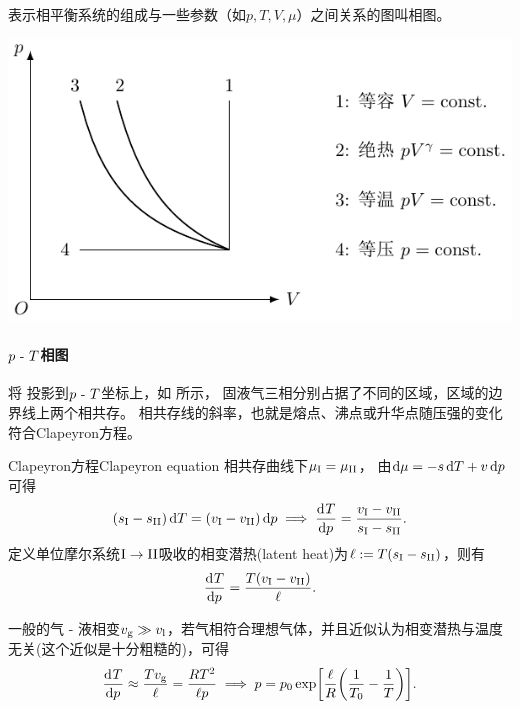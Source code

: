 表示相平衡系统的组成与一些参数（如$p,T,V,\mu$）之间关系的图叫相图。
\begin{center}
	\includegraphics[page=8]{figures/tikz/coordinates.pdf}
	\label{fig:H2O phase P-T-V}
\end{center}

\paragraph{$p~\text{-}~ T$相图}

将 投影到$p~\text{-}~ T$坐标上，如 所示，
固液气三相分别占据了不同的区域，区域的边界线上两个相共存。
相共存线的斜率，也就是熔点、沸点或升华点随压强的变化符合Clapeyron方程。

\begin{theorem}
	{Clapeyron方程}{Clapeyron equation}
	相共存曲线下$\mu_{\mathrm{I}}=\mu_{\mathrm{II}}$，
	由$\mathop{}\!\mathrm{d}\mu=-s\mathop{}\!\mathrm{d} T+v\mathop{}\!\mathrm{d} p$可得
	\[
		(s_{\mathrm{I}}-s_{\mathrm{II}})\mathop{}\!\mathrm{d} T=(v_{\mathrm{I}}-v_{\mathrm{II}})\mathop{}\!\mathrm{d} p\implies\frac{\mathrm{d}^{{}}T}{\mathrm{d}{p}^{{}}}=\frac{v_{\mathrm{I}}-v_{\mathrm{II}}}{s_{\mathrm{I}}-s_{\mathrm{II}}}.
	\]
	定义单位摩尔系统$\mathrm{I}\to\mathrm{II}$吸收的相变潜热(latent heat)为$\ell:=T(s_{\mathrm{I}}-s_{\mathrm{II}})$，则有
	\begin{equation}
		\frac{\mathrm{d}^{{}}T}{\mathrm{d}{p}^{{}}}=\frac{T(v_{\mathrm{I}}-v_{\mathrm{II}})}\ell.
	\end{equation}
\end{theorem}

\begin{corollary}
	一般的气 - 液相变$v_{\mathrm{g}}\gg v_{\mathrm{l}}$，若气相符合理想气体，并且近似认为相变潜热与温度无关(这个近似是十分粗糙的)，可得 
	\[
		\frac{\mathrm{d}^{{}}T}{\mathrm{d}{p}^{{}}}\approx\frac{Tv_{\mathrm{g}}}\ell=\frac{RT^2}{\ell p}\implies p=p_0\exp\biggl[\frac\ell{R}\biggl(\frac1{T_0}-\frac1T\biggr)\biggr].
	\]
	
\end{corollary}

